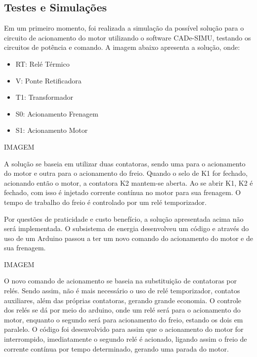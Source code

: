 \subsection{Testes e Simulações}
Em um primeiro momento, foi realizada a simulação da possível solução para o circuito de acionamento do motor utilizando o software CADe-SIMU, testando os circuitos de potência e comando. A imagem abaixo apresenta a solução, onde:

\begin{itemize}
    \item RT: Relé Térmico
    \item V: Ponte Retificadora
    \item T1: Transformador
    \item S0: Acionamento Frenagem
    \item S1: Acionamento Motor 
\end{itemize}

IMAGEM

A solução se baseia em utilizar duas contatoras, sendo uma para o acionamento do motor e outra para o acionamento do freio. Quando o selo de K1 for fechado, acionando então o motor, a contatora K2 mantem-se aberta. Ao se abrir K1, K2 é fechado, com isso é injetado corrente contínua no motor para sua frenagem. O tempo de trabalho do freio é controlado por um relé temporizador. 

Por questões de praticidade e custo benefício, a solução apresentada acima não será implementada. O subsistema de energia desenvolveu um código e através do uso de um Arduino  passou a ter um novo comando do acionamento do motor e de sua frenagem. 

IMAGEM

O novo comando de acionamento se baseia na substituição de contatoras por relés. Sendo assim, não é mais necessário o uso de relé temporizador, contatos auxiliares, além das próprias contatoras, gerando grande economia. O controle dos relés se dá por meio do arduino, onde um relé será para o acionamento do motor, enquanto o segundo será para acionamento do freio, estando os dois em paralelo. O código foi desenvolvido para assim que o acionamento do motor for interrompido, imediatamente o segundo relé é acionado, ligando assim o freio de corrente contínua por tempo determinado, gerando uma parada do motor.
